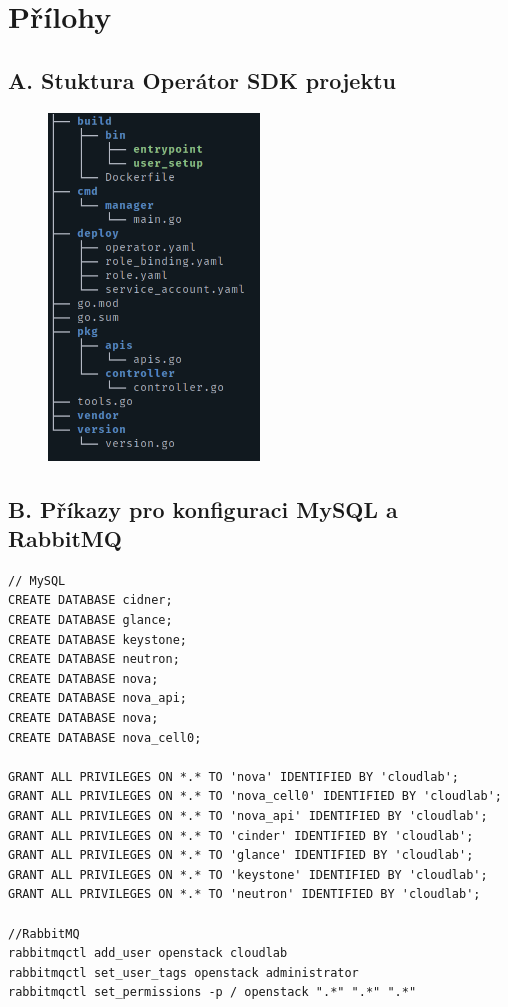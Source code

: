 \chapter{Přílohy}
\setcounter{page}{1}
\section*{A. Stuktura Operátor SDK projektu\label{atch:tree}}

\begin{figure}[H]
  \includegraphics[width=0.5\textwidth]{img/operatorsdk_tree.png}
\end{figure}

\clearpage

\section*{B. Příkazy pro konfiguraci MySQL a RabbitMQ\label{atch:command}}
\begin{verbatim}
// MySQL
CREATE DATABASE cidner;
CREATE DATABASE glance;
CREATE DATABASE keystone;
CREATE DATABASE neutron;
CREATE DATABASE nova;
CREATE DATABASE nova_api;
CREATE DATABASE nova;
CREATE DATABASE nova_cell0;

GRANT ALL PRIVILEGES ON *.* TO 'nova' IDENTIFIED BY 'cloudlab';
GRANT ALL PRIVILEGES ON *.* TO 'nova_cell0' IDENTIFIED BY 'cloudlab';
GRANT ALL PRIVILEGES ON *.* TO 'nova_api' IDENTIFIED BY 'cloudlab';
GRANT ALL PRIVILEGES ON *.* TO 'cinder' IDENTIFIED BY 'cloudlab';
GRANT ALL PRIVILEGES ON *.* TO 'glance' IDENTIFIED BY 'cloudlab';
GRANT ALL PRIVILEGES ON *.* TO 'keystone' IDENTIFIED BY 'cloudlab';
GRANT ALL PRIVILEGES ON *.* TO 'neutron' IDENTIFIED BY 'cloudlab';

//RabbitMQ
rabbitmqctl add_user openstack cloudlab
rabbitmqctl set_user_tags openstack administrator
rabbitmqctl set_permissions -p / openstack ".*" ".*" ".*"
\end{verbatim}

\clearpage